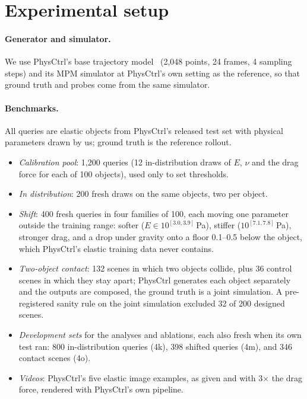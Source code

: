 \section{Experimental setup}
\label{sec:setup}

\paragraph{Generator and simulator.}
We use PhysCtrl's base trajectory model~\cite{wang2025physctrl} (2{,}048 points, 24 frames, 4 sampling steps) and its MPM simulator at PhysCtrl's own setting as the reference, so that ground truth and probes come from the same simulator.

\paragraph{Benchmarks.}
All queries are elastic objects from PhysCtrl's released test set with physical parameters drawn by us; ground truth is the reference rollout.
\begin{itemize}
\item \emph{Calibration pool}: 1{,}200 queries (12 in-distribution draws of $E$, $\nu$ and the drag force for each of 100 objects), used only to set thresholds.
\item \emph{In distribution}: 200 fresh draws on the same objects, two per object.
\item \emph{Shift}: 400 fresh queries in four families of 100, each moving one parameter outside the training range: softer ($E \in 10^{[3.0, 3.9]}$\,Pa), stiffer ($10^{[7.1, 7.8]}$\,Pa), stronger drag, and a drop under gravity onto a floor 0.1--0.5 below the object, which PhysCtrl's elastic training data never contains.
\item \emph{Two-object contact}: 132 scenes in which two objects collide, plus 36 control scenes in which they stay apart; PhysCtrl generates each object separately and the outputs are composed, the ground truth is a joint simulation.
A pre-registered sanity rule on the joint simulation excluded 32 of 200 designed scenes.
\item \emph{Development sets} for the analyses and ablations, each also fresh when its own test ran: 800 in-distribution queries (4k), 398 shifted queries (4m), and 346 contact scenes (4o).
\item \emph{Videos}: PhysCtrl's five elastic image examples, as given and with 3$\times$ the drag force, rendered with PhysCtrl's own pipeline.
\end{itemize}

